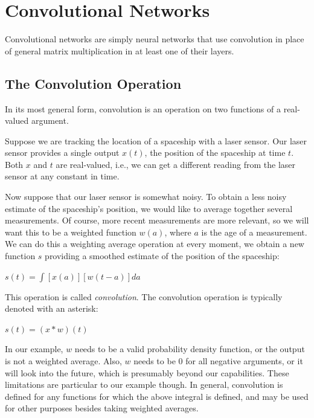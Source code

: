 \documentclass{report}
\begin{document}
\chapter{Convolutional Networks}
Convolutional networks are simply neural networks that use convolution in place of general matrix multiplication in at least one of their layers.

\section{The Convolution Operation}
In its most general form, convolution is an operation on two functions of a real-valued argument.\newline

\noindent Suppose we are tracking the location of a spaceship with a laser sensor. Our laser sensor provides a single output $x(t)$, the position of the spaceship at time $t$. Both $x$ and $t$ are real-valued, i.e., we can get a different reading from the laser sensor at any constant in time.\newline

\noindent Now suppose that our laser sensor is somewhat noisy. To obtain a less noisy estimate of the spaceship's position, we would like to average together several measurements. Of course, more recent measurements are more relevant, so we will want this to be a weighted function $w(a)$, where $a$ is the age of a measurement. We can do this a weighting average operation at every moment, we obtain a new function $s$ providing a smoothed estimate of the position of the spaceship:\newline\newline
    \centerline{$s(t) = \int [x(a)][w(t-a)]da$}\newline\newline
\noindent This operation is called \textit{convolution}. The convolution operation is typically denoted with an asterisk:\newline
    \centerline{$s(t) = (x * w)(t)$}\newline

In our example, $w$ needs to be a valid probability density function, or the output is not a weighted average. Also, $w$ needs to be 0 for all negative arguments, or it will look into the future, which is presumably beyond our capabilities. These limitations are particular to our example though. In general, convolution is defined for any functions for which the above integral is defined, and may be used for other purposes besides taking weighted averages.\newline
\end{document}
